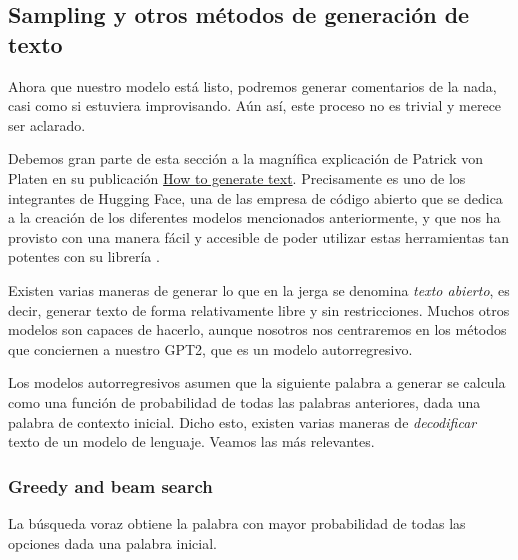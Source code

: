 \subsection{Sampling y otros métodos de generación de texto}
Ahora que nuestro modelo está listo, podremos generar comentarios de la nada, casi como si estuviera improvisando. Aún así, este proceso no es trivial y merece ser aclarado.

Debemos gran parte de esta sección a la magnífica explicación de Patrick von Platen en su publicación \href{https://huggingface.co/blog/how-to-generate}{How to generate text}. Precisamente es uno de los integrantes de Hugging Face, una de las empresa de código abierto que se dedica a la creación de los diferentes modelos mencionados anteriormente, y que nos ha provisto con una manera fácil y accesible de poder utilizar estas herramientas tan potentes con su librería  \cite{WolfEtal2020Transformers}.

Existen varias maneras de generar lo que en la jerga se denomina \textit{texto abierto}, es decir, generar texto de forma relativamente libre y sin restricciones. Muchos otros modelos son capaces de hacerlo, aunque nosotros nos centraremos en los métodos que conciernen a nuestro GPT2, que es un modelo autorregresivo.

Los modelos autorregresivos asumen que la siguiente palabra a generar se calcula como una función de probabilidad de todas las palabras anteriores, dada una palabra de contexto inicial. Dicho esto, existen varias maneras de \textit{decodificar} texto de un modelo de lenguaje. Veamos las más relevantes.

\subsubsection{Greedy and beam search}
La búsqueda voraz obtiene la palabra con mayor probabilidad de todas las opciones dada una palabra inicial. 


